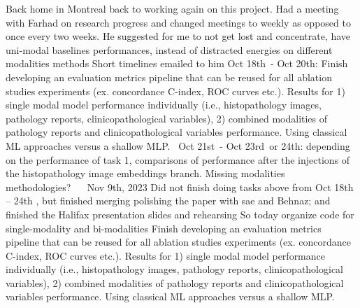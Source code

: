 \documentclass{article}%
\begin{document}
%
Back home in Montreal back to working again on this project. %
\newline%
\newline%
%
Had a meeting with Farhad on research progress and changed meetings to weekly as opposed to once every two weeks. %
\newline%
\newline%
%
He suggested for me to not get lost and concentrate, have uni{-}modal baselines performances, instead of distracted energies on different modalities methods %
\newline%
\newline%
%
Short timelines emailed to him %
\newline%
\newline%
%
Oct 18th~{-} Oct 20th: Finish developing an evaluation metrics pipeline that can be reused for all ablation studies experiments (ex. concordance C{-}index, ROC curves etc.). Results for 1) single modal model performance individually (i.e., histopathology images, pathology reports, clinicopathological variables), 2) combined modalities of pathology reports and clinicopathological variables performance. Using classical ML approaches versus a shallow MLP.~%
\newline%
\newline%
%
Oct 21st~{-} Oct 23rd~or 24th: depending on the performance of task 1, comparisons of performance after the injections of the histopathology image embeddings branch. Missing modalities methodologies?~ ~%
\newline%
\newline%
%
Nov 9th, 2023 %
\newline%
\newline%
%
Did not finish doing tasks above from Oct 18th – 24th , but finished merging polishing the paper with sae and Behnaz; and finished the Halifax presentation slides and rehearsing %
\newline%
\newline%
%
So today organize code for single{-}modality and bi{-}modalities %
\newline%
\newline%
%
Finish developing an evaluation metrics pipeline that can be reused for all ablation studies experiments (ex. concordance C{-}index, ROC curves etc.). Results for 1) single modal model performance individually (i.e., histopathology images, pathology reports, clinicopathological variables), 2) combined modalities of pathology reports and clinicopathological variables performance. Using classical ML approaches versus a shallow MLP. %
\end{document}
